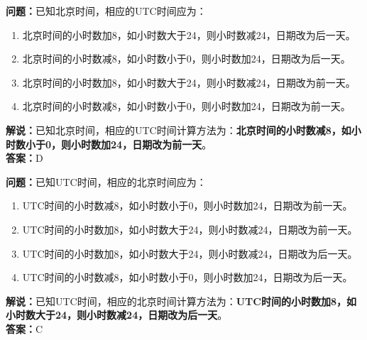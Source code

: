 \documentclass{ctexbook}
\begin{document}
\bigskip


\noindent\textbf{问题：}已知北京时间，相应的UTC时间应为：

\begin{enumerate}[label=\Alph*), leftmargin=3em]
	\item 北京时间的小时数加8，如小时数大于24，则小时数减24，日期改为后一天。
	\item 北京时间的小时数减8，如小时数小于0，则小时数加24，日期改为后一天。
	\item 北京时间的小时数加8，如小时数大于24，则小时数减24，日期改为前一天。
	\item 北京时间的小时数减8，如小时数小于0，则小时数加24，日期改为前一天。
\end{enumerate}

\noindent\textbf{解说：}已知北京时间，相应的UTC时间计算方法为：\textbf{北京时间的小时数减8，如小时数小于0，则小时数加24，日期改为前一天}。\\\noindent\textbf{答案：}D


\bigskip


\noindent\textbf{问题：}已知UTC时间，相应的北京时间应为：

\begin{enumerate}[label=\Alph*), leftmargin=3em]
	\item UTC时间的小时数减8，如小时数小于0，则小时数加24，日期改为前一天。
	\item UTC时间的小时数加8，如小时数大于24，则小时数减24，日期改为前一天。
	\item UTC时间的小时数加8，如小时数大于24，则小时数减24，日期改为后一天。
	\item UTC时间的小时数减8，如小时数小于0，则小时数加24，日期改为后一天。
\end{enumerate}

\noindent\textbf{解说：}已知UTC时间，相应的北京时间计算方法为：\textbf{UTC时间的小时数加8，如小时数大于24，则小时数减24，日期改为后一天}。\\\noindent\textbf{答案：}C


\bigskip
\end{document}
